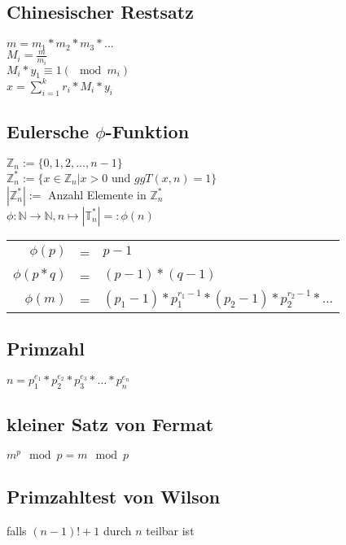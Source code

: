 \subsection{Chinesischer Restsatz}
$m = m_1 * m_2 * m_3 * \dots $ \\
$M_i = \frac{m}{m_i}$ \\
$M_i * y_1 \equiv 1 (\mod m_i)$ \\
$x = \sum_{i=1}^{k} r_i * M_i * y_i$

\subsection{Eulersche $\phi$-Funktion}
$\mathbb{Z}_n := \{ 0, 1, 2, \ldots, n-1\} $ \\
$\mathbb{Z}_n^* := \{ x \in \mathbb{Z}_n | x > 0 $ und $ ggT(x,n) = 1 \} $ \\
$|\mathbb{Z}_n^*| := $ Anzahl Elemente in $\mathbb{Z}_n^*$ \\

$\phi : \mathbb{N} \rightarrow \mathbb{N}, n \mapsto |\mathbb{T}_n^*| =: \phi (n) $ \\

\begin{tabular}{rcl}
    $\phi (p)$ & = & $p - 1$ \\
    $\phi (p * q)$ & = & $(p - 1) * (q - 1)$ \\
    $\phi (m)$ & = & $(p_1 - 1) * p_1^{r_1 - 1} * (p_2 - 1) * p_2^{r_2 - 1} * \ldots $ \\
\end{tabular}

\subsection{Primzahl}
$ n = p_1^{e_1} * p_2^{e_2} * p_3^{e_3} * \ldots *  p_n^{e_n} $

\subsection{kleiner Satz von Fermat}
$m^p \mod p = m \mod p$

\subsection{Primzahltest von Wilson}
falls $(n - 1)! + 1$ durch $n$ teilbar ist

